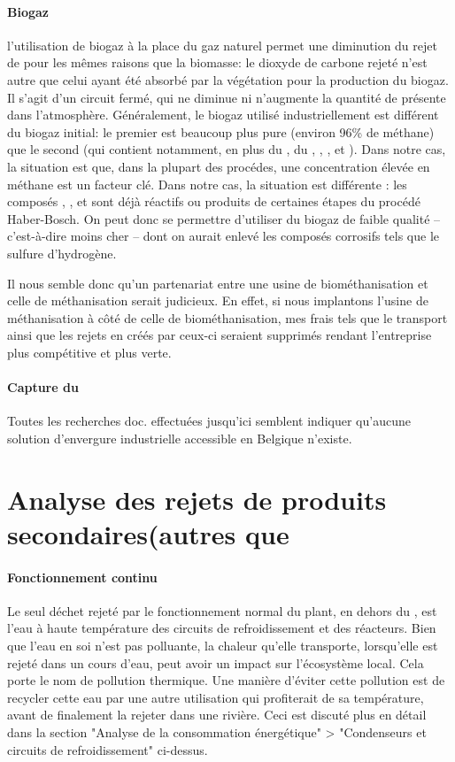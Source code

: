 \documentclass[10pt,a4paper]{report}
\begin{document}
\paragraph{Biogaz}
l'utilisation de biogaz à la place du gaz naturel permet une diminution du rejet de  pour les mêmes raisons que la biomasse: le dioxyde de carbone rejeté n'est autre que celui ayant été absorbé par la végétation pour la production du biogaz. Il s'agit d'un circuit fermé, qui ne diminue ni n'augmente la quantité de  présente dans l'atmosphère.
Généralement, le biogaz utilisé industriellement est différent du biogaz initial: le premier est beaucoup plus pure (environ 96\% de méthane) que le second (qui contient notamment, en plus du , du , , ,  et ). Dans notre cas, la situation est que, dans la plupart des procédes, une concentration élevée en méthane est un facteur clé. Dans notre cas, la situation est différente : les composés , ,  et  sont déjà réactifs ou produits de certaines étapes du procédé Haber-Bosch. On peut donc se permettre d'utiliser du biogaz de faible qualité -- c'est-à-dire moins cher -- dont on aurait enlevé les composés corrosifs tels que le sulfure d'hydrogène.

Il nous semble donc qu'un partenariat entre une usine de biométhanisation et celle de méthanisation serait judicieux. En effet, si nous implantons l'usine de méthanisation à côté de celle de biométhanisation, mes frais tels que le transport ainsi que les rejets en  créés par ceux-ci seraient supprimés rendant l'entreprise plus compétitive et plus verte.
\paragraph{Capture du }
Toutes les recherches doc. effectuées jusqu'ici semblent indiquer qu'aucune solution d'envergure industrielle accessible en Belgique n'existe.
\section{Analyse des rejets de produits secondaires(autres que }
\paragraph{Fonctionnement continu}
Le seul déchet rejeté par le fonctionnement normal du plant, en dehors du , est l'eau à haute température des circuits de refroidissement et des réacteurs. Bien que l'eau en soi n'est pas polluante, la chaleur qu'elle transporte, lorsqu'elle est rejeté dans un cours d'eau, peut avoir un impact sur l'écosystème local. Cela porte le nom de pollution thermique.
Une manière d'éviter cette pollution est de recycler cette eau par une autre utilisation qui profiterait de sa température, avant de finalement la rejeter dans une rivière. Ceci est discuté plus en détail dans la section "Analyse de la consommation énergétique" > "Condenseurs et circuits de refroidissement" ci-dessus.
\end{document}
